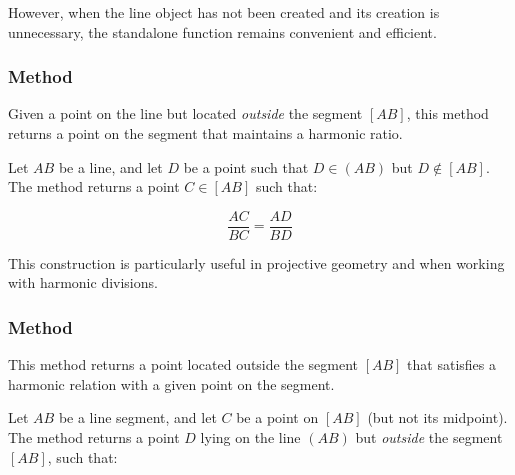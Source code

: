 \medskip
\noindent
However, when the line object has not been created and its creation is unnecessary, the standalone function  remains convenient and efficient.


\begin{center}
\end{center}

\subsubsection{Method }
\label{ssub:method_line_harmonic_int}

Given a point on the line but located \emph{outside} the segment $[AB]$, this method returns a point on the segment that maintains a harmonic ratio.

\medskip
\noindent
Let $AB$ be a line, and let $D$ be a point such that $D \in (AB)$ but $D \not\in [AB]$. The method returns a point $C \in [AB]$ such that:

\[
\frac{AC}{BC} = \frac{AD}{BD}
\]

\noindent
This construction is particularly useful in projective geometry and when working with harmonic divisions.

\vspace{2em}
\begin{tkzexample}
\begin{center}
\end{center}

\end{tkzexample}

\subsubsection{Method }
\label{ssub:method_imeth_line_harmonic__ext_pt}
This method returns a point located outside the segment $[AB]$ that satisfies a harmonic relation with a given point on the segment.

\medskip
\noindent
Let $AB$ be a line segment, and let $C$ be a point on $[AB]$ (but not its midpoint). The method returns a point $D$ lying on the line $(AB)$ but \emph{outside} the segment $[AB]$, such that:

